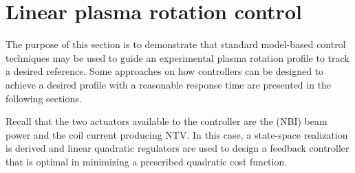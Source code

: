 \documentclass[12pt,lot, lof]{puthesis}
\begin{document}
\section{Linear plasma rotation control}
 \label{LRPC}
 
 The purpose of this section is to demonstrate that standard model-based control techniques may be used to guide an experimental plasma rotation profile to track a desired reference. Some approaches on how controllers can be designed to achieve a desired profile with a reasonable response time are presented in the following sections.
 
 Recall that the two actuators available to the controller are the (NBI) beam power and the coil current producing NTV.
In this case, a state-space realization is derived and linear quadratic regulators are used to design a feedback controller that is optimal in minimizing a prescribed quadratic cost function.
\end{document}
